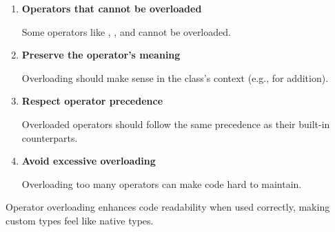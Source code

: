 \begin{tipsblock}
    \begin{enumerate}

        \item \textbf{Operators that cannot be overloaded}
        
        Some operators like \plaintt{::}, , and  cannot be overloaded.
        
        \item \textbf{Preserve the operator's meaning}
        
        Overloading should make sense in the class's context (e.g., \plaintt{+} for addition).
        
        \item \textbf{Respect operator precedence}
        
        Overloaded operators should follow the same precedence as their built-in counterparts.
        
        \item \textbf{Avoid excessive overloading}
        
        Overloading too many operators can make code hard to maintain.

    \end{enumerate}
\end{tipsblock}

Operator overloading enhances code readability when used correctly, making custom types feel like native types.